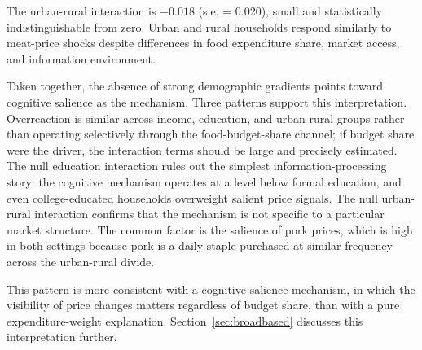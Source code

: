 The urban-rural interaction is $-0.018$ (s.e. = 0.020),
small and statistically indistinguishable from zero.
Urban and rural households respond similarly to meat-price
shocks despite differences in food expenditure share, market
access, and information environment.

Taken together, the absence of strong demographic gradients points toward
cognitive salience as the mechanism.
Three patterns support this interpretation.
Overreaction is similar across income, education, and
urban-rural groups rather than operating selectively through
the food-budget-share channel; if budget share were the driver,
the interaction terms should be large and precisely estimated.
The null education interaction rules out the simplest
information-processing story: the cognitive mechanism operates
at a level below formal education, and even college-educated
households overweight salient price signals.
The null urban-rural interaction confirms that the mechanism
is not specific to a particular market structure.
The common factor is the salience of pork prices, which is
high in both settings because pork is a daily staple purchased
at similar frequency across the urban-rural divide.

This pattern is more consistent with a cognitive salience
mechanism, in which the visibility of price changes matters
regardless of budget share, than with a pure
expenditure-weight explanation.
Section~\ref{sec:broadbased} discusses this interpretation
further.

